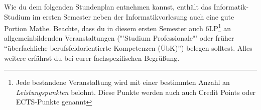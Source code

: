 Wie du dem folgenden Stundenplan entnehmen kannst, enthält das Informatik-Studium im ersten
Semester neben der Informatikvorlesung auch eine gute Portion Mathe. Beachte, dass du
in diesem ersten Semester auch 6LP\footnote{Jede bestandene Veranstaltung wird mit einer bestimmten Anzahl an \emph{Leistungspunkten} belohnt. Diese Punkte werden auch auch Credit Points oder ECTS-Punkte genannt} an allgemeinbildenden Veranstaltungen ("'Studium Professionale"' oder früher "`überfachliche berufsfeldorientierte Kompetenzen (ÜbK)"') belegen solltest.
Alles weitere erfährst du bei eurer fachspezifischen Begrüßung.

\noindent\makebox[\textwidth][c]{%
	\setlength{\fboxrule}{4pt}
	\fcolorbox{red}{white}{
		\begin{minipage}[t]{
			\textwidth}\textbf{Achtung!} Die Daten für die Vorlesungstermine können sich noch ändern. Schau am besten auf Alma (\url{https://alma.uni-tuebingen.de/}), ob die Termine dort geupdatet wurden.
		\end{minipage}}}

